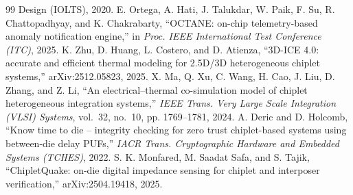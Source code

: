 \documentclass[11pt,a4paper,fontset=mac]{ctexart}
\begin{document}
\begin{thebibliography}{99}
{Design (IOLTS)}, 2020.
 E. Ortega, A. Hati, J. Talukdar, W. Paik, F. Su, R. Chattopadhyay,
and K. Chakrabarty, ``OCTANE: on-chip telemetry-based anomaly notification engine,''
in \emph{Proc. IEEE International Test Conference (ITC)}, 2025.
 K. Zhu, D. Huang, L. Costero, and D. Atienza,
``3D-ICE 4.0: accurate and efficient thermal modeling for 2.5D/3D heterogeneous chiplet systems,''
arXiv:2512.05823, 2025.
 X. Ma, Q. Xu, C. Wang, H. Cao, J. Liu, D. Zhang, and Z. Li,
``An electrical--thermal co-simulation model of chiplet heterogeneous integration systems,''
\emph{IEEE Trans. Very Large Scale Integration (VLSI) Systems}, vol.~32, no.~10,
pp. 1769--1781, 2024.
 A. Deric and D. Holcomb,
``Know time to die -- integrity checking for zero trust chiplet-based systems using between-die
delay PUFs,'' \emph{IACR Trans. Cryptographic Hardware and Embedded Systems (TCHES)}, 2022.
 S. K. Monfared, M. Saadat Safa, and S. Tajik,
``ChipletQuake: on-die digital impedance sensing for chiplet and interposer verification,''
arXiv:2504.19418, 2025.
\end{thebibliography}
\end{document}

